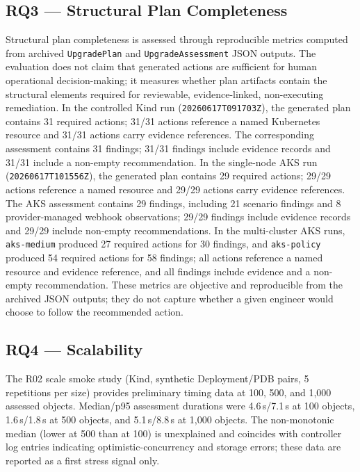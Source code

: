 \documentclass[10pt,journal]{IEEEtran}
\newcommand{\crd}[1]{\texttt{#1}}
\newcommand{\code}[1]{\texttt{#1}}
\begin{document}
\subsection{RQ3 --- Structural Plan Completeness}\label{sec:rq3}
Structural plan completeness is assessed through reproducible metrics computed from archived \crd{UpgradePlan} and \crd{UpgradeAssessment} JSON outputs. The evaluation does not claim that generated actions are sufficient for human operational decision-making; it measures whether plan artifacts contain the structural elements required for reviewable, evidence-linked, non-executing remediation. In the controlled Kind run (\code{20260617T091703Z}), the generated plan contains 31 required actions; 31/31 actions reference a named Kubernetes resource and 31/31 actions carry evidence references. The corresponding assessment contains 31 findings; 31/31 findings include evidence records and 31/31 include a non-empty recommendation. In the single-node AKS run (\code{20260617T101556Z}), the generated plan contains 29 required actions; 29/29 actions reference a named resource and 29/29 actions carry evidence references. The AKS assessment contains 29 findings, including 21 scenario findings and 8 provider-managed webhook observations; 29/29 findings include evidence records and 29/29 include non-empty recommendations. In the multi-cluster AKS runs, \code{aks-medium} produced 27 required actions for 30 findings, and \code{aks-policy} produced 54 required actions for 58 findings; all actions reference a named resource and evidence reference, and all findings include evidence and a non-empty recommendation. These metrics are objective and reproducible from the archived JSON outputs; they do not capture whether a given engineer would choose to follow the recommended action.

\subsection{RQ4 --- Scalability}\label{sec:rq4}
The R02 scale smoke study (Kind, synthetic Deployment/PDB pairs, 5 repetitions per size) provides preliminary timing data at 100, 500, and 1,000 assessed objects. Median/p95 assessment durations were 4.6\,s/7.1\,s at 100 objects, 1.6\,s/1.8\,s at 500 objects, and 5.1\,s/8.8\,s at 1,000 objects. The non-monotonic median (lower at 500 than at 100) is unexplained and coincides with controller log entries indicating optimistic-concurrency and storage errors; these data are reported as a first stress signal only.
\end{document}
